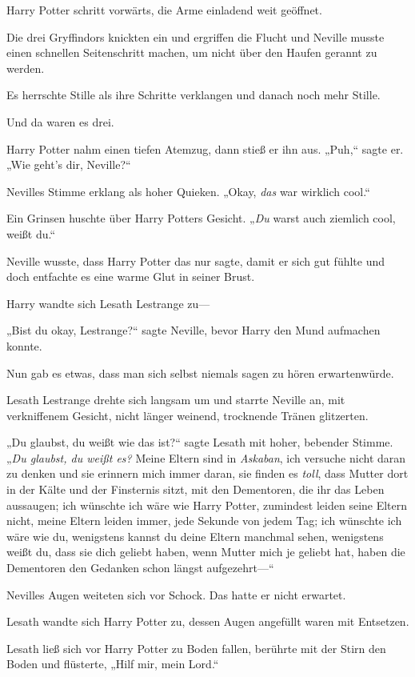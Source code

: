 {Harry Potter schritt vorwärts, die Arme einladend weit geöffnet.

Die drei Gryffindors knickten ein und ergriffen die Flucht und Neville musste einen schnellen Seitenschritt machen, um nicht über den Haufen gerannt zu werden.

Es herrschte Stille als ihre Schritte verklangen und danach noch mehr Stille.

Und da waren es drei.

Harry Potter nahm einen tiefen Atemzug, dann stieß er ihn aus. „Puh,“ sagte er. „Wie geht's dir, Neville?“

Nevilles Stimme erklang als hoher Quieken. „Okay, \emph{das} war wirklich cool.“

Ein Grinsen huschte über Harry Potters Gesicht. „\emph{Du} warst auch ziemlich cool, weißt du.“

Neville wusste, dass Harry Potter das nur sagte, damit er sich gut fühlte und doch entfachte es eine warme Glut in seiner Brust.

Harry wandte sich Lesath Lestrange zu—

„Bist du okay, Lestrange?“ sagte Neville, bevor Harry den Mund aufmachen konnte.

Nun gab es etwas, dass man sich selbst niemals sagen zu hören erwartenwürde.

Lesath Lestrange drehte sich langsam um und starrte Neville an, mit verkniffenem Gesicht, nicht länger weinend, trocknende Tränen glitzerten.

„Du glaubst, du weißt wie das ist?“ sagte Lesath mit hoher, bebender Stimme. „\emph{Du glaubst, du weißt es?} Meine Eltern sind in \emph{Askaban}, ich versuche nicht daran zu denken und sie erinnern mich immer daran, sie finden es \emph{toll}, dass Mutter dort in der Kälte und der Finsternis sitzt, mit den Dementoren, die ihr das Leben aussaugen; ich wünschte ich wäre wie Harry Potter, zumindest leiden seine Eltern nicht, meine Eltern leiden immer, jede Sekunde von jedem Tag; ich wünschte ich wäre wie du, wenigstens kannst du deine Eltern manchmal sehen, wenigstens weißt du, dass sie dich geliebt haben, wenn Mutter mich je geliebt hat, haben die Dementoren den Gedanken schon längst aufgezehrt—“

Nevilles Augen weiteten sich vor Schock. Das hatte er nicht erwartet.

Lesath wandte sich Harry Potter zu, dessen Augen angefüllt waren mit Entsetzen.

Lesath ließ sich vor Harry Potter zu Boden fallen, berührte mit der Stirn den Boden und flüsterte, „Hilf mir, mein Lord.“

}
